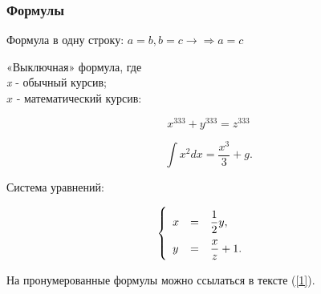 \documentclass[14pt,a4paper,oneside]{extarticle}	%
\begin{document}
\subsubsection{Формулы}		%

Формула в одну строку: $ a = b, b = c → \Rightarrow a = c $

«Выключная» формула, где\\ 
\textit{x} - обычный курсив;\\
$ x $ - математический курсив:

$$
 x^{333} + y^{333} = z^{333}
$$

\[
\int x^2 dx = \frac{x^3}{3} + g.
\]

Система уравнений:

\begin{equation}
\begin{cases}\renewcommand{\arraystretch}{2.}
\begin{array}{lcl}
x &=& \dfrac{1}{2}y, \\
y &=& \dfrac{x}{z}+1.
\end{array}
\end{cases}
\label{1}
\end{equation}

На пронумерованные формулы можно ссылаться в тексте (\ref{1}).

\newpage

	\begin{center} 	%
	\end{center}
\end{document}
